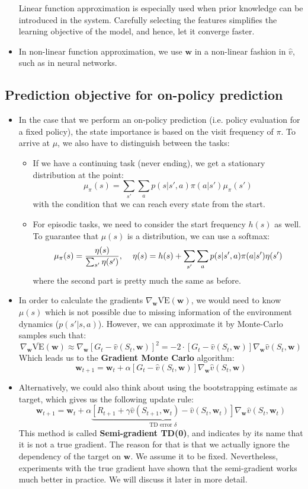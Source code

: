 \begin{itemize}
	Linear function approximation is especially used when prior knowledge can be introduced in the system. Carefully selecting the features simplifies the learning objective of the model, and hence, let it converge faster.
	
	\item In non-linear function approximation, we use $\bm{w}$ in a non-linear fashion in $\hat{v}$, such as in neural networks.
	
\end{itemize}
\subsection{Prediction objective for on-policy prediction}
\begin{itemize}
	\item In the case that we perform an on-policy prediction (i.e. policy evaluation for a fixed policy), the state importance is based on the visit frequency of $\pi$. To arrive at $\mu$, we also have to distinguish between the tasks:
	\begin{itemize}
		\item If we have a continuing task (never ending), we get a stationary distribution at the point:
		$$\mu_{\pi}(s)=\sum_{s'}\sum_{a}p(s|s',a)\pi(a|s')\mu_{\pi}(s')$$
		with the condition that we can reach every state from the start.
		\item For episodic tasks, we need to consider the start frequency $h(s)$ as well. To guarantee that $\mu(s)$ is a distribution, we can use a softmax:
		$$\mu_{\pi}(s)=\frac{\eta(s)}{\sum_{s'}\eta(s')}, \hspace{4mm}\eta(s)=h(s)+\sum_{s'}\sum_a p(s|s',a)\pi(a|s')\eta(s')$$
		where the second part is pretty much the same as before.
	\end{itemize} 
	\item In order to calculate the gradients $\nabla_{\bm{w}}\overline{\text{VE}}(\bm{w})$, we would need to know $\mu(s)$ which is not possible due to missing information of the environment dynamics ($p(s'|s,a)$). However, we can approximate it by Monte-Carlo samples such that:
	$$\nabla_{\bm{w}}\overline{\text{VE}}(\bm{w})\approx \nabla_{\bm{w}}\left[G_t - \hat{v}(S_t,\bm{w})\right]^2 = -2\cdot \left[G_t - \hat{v}(S_t,\bm{w})\right] \nabla_{\bm{w}}\hat{v}(S_t,\bm{w})$$
	Which leads us to the \textbf{Gradient Monte Carlo} algorithm:
	$$\bm{w}_{t+1}=\bm{w}_{t}+\alpha \left[G_t - \hat{v}(S_t,\bm{w})\right] \nabla_{\bm{w}}\hat{v}(S_t,\bm{w})$$
	\item Alternatively, we could also think about using the bootstrapping estimate as target, which gives us the following update rule:
	$$\bm{w}_{t+1}=\bm{w}_t + \alpha\underbrace{\left[R_{t+1} + \gamma\hat{v}(S_{t+1},\bm{w}_t) - \hat{v}(S_t,\bm{w}_t)\right]}_{\text{TD error }\delta}\nabla_{\bm{w}}\hat{v}(S_t,\bm{w}_t)$$  
	This method is called \textbf{Semi-gradient TD(0)}, and indicates by its name that it is not a true gradient. The reason for that is that we actually ignore the dependency of the target on $\bm{w}$. We assume it to be fixed.  Nevertheless, experiments with the true gradient have shown that the semi-gradient works much better in practice. We will discuss it later in more detail.
	

\end{itemize}
